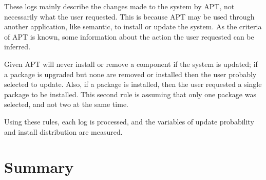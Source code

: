 These logs mainly describe the changes made to the system by APT, not necessarily what the user requested.
This is because APT may be used through another application, like semantic, to install or update the system.
As the criteria of APT is known, some information about the action the user requested can be inferred.

Given APT will never install or remove a component if the system is updated; 
if a package is upgraded but none are removed or installed then the user probably selected to update.
Also, if a package is installed, then the user requested a single package to be installed.
This second rule is assuming that only one package was selected, and not two at the same time.

Using these rules, each log is processed, and the variables of update probability and install distribution are measured.

\section{Summary}
